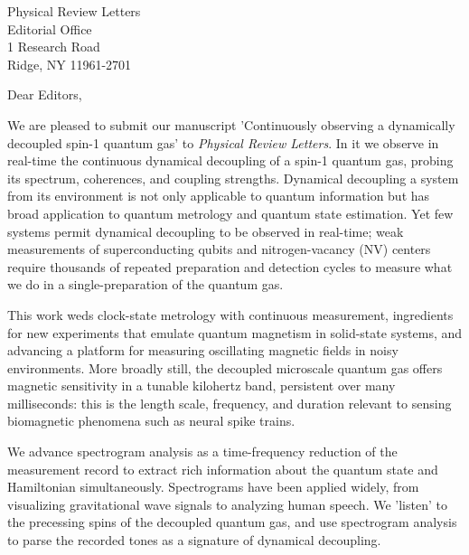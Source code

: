 \documentclass[10pt,letterpaper]{letter} %
\begin{document}

\begin{letter}{
	Physical Review Letters\\
	Editorial Office\\
	1 Research Road \\
	Ridge, NY 11961-2701\\
}


\opening{Dear Editors,}

We are pleased to submit our manuscript 'Continuously observing a dynamically decoupled spin-1 quantum gas' to \textit{Physical Review Letters}.
In it we observe in real-time the continuous dynamical decoupling of a spin-1 quantum gas, probing its spectrum, coherences, and coupling strengths.
Dynamical decoupling a system from its environment is not only applicable to quantum information but has broad application to quantum metrology and quantum state estimation.
Yet few systems permit dynamical decoupling to be observed in real-time; weak measurements of superconducting qubits and nitrogen-vacancy (NV) centers require thousands of repeated preparation and detection cycles to measure what we do in a single-preparation of the quantum gas.

This work weds clock-state metrology with continuous measurement, ingredients for new experiments that emulate quantum magnetism in solid-state systems, and advancing a platform for measuring oscillating magnetic fields in noisy environments.
More broadly still, the decoupled microscale quantum gas offers magnetic sensitivity in a tunable kilohertz band, persistent over many milliseconds: this is the length scale, frequency, and duration relevant to sensing biomagnetic phenomena such as neural spike trains.

We advance spectrogram analysis as a time-frequency reduction of the measurement record to extract rich information about the quantum state and Hamiltonian simultaneously.
Spectrograms have been applied widely, from visualizing gravitational wave signals to analyzing human speech.
We 'listen' to the precessing spins of the decoupled quantum gas, and use spectrogram analysis to parse the recorded tones as a signature of dynamical decoupling.


\end{letter}
\end{document}
